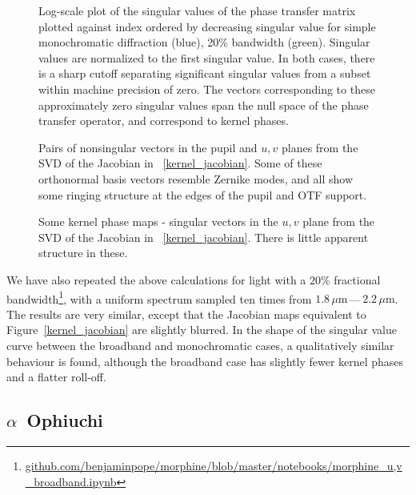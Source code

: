 \documentclass[modern]{aastex63}
\begin{document}
\begin{figure}
     \caption{Log-scale plot of the singular values of the phase transfer matrix plotted against index ordered by decreasing singular value for simple monochromatic diffraction (blue), 20\% bandwidth (green). Singular values are normalized to the first singular value. In both cases, there is a sharp cutoff separating significant singular values from a subset within machine precision of zero. The vectors corresponding to these approximately zero singular values span the null space of the phase transfer operator, and correspond to kernel phases.}
    \label{fig:svd}
\end{figure}

\begin{figure}
\caption{Pairs of nonsingular vectors in the pupil and $u,v$ planes from the SVD of the Jacobian in ~\ref{kernel_jacobian}. Some of these orthonormal basis vectors resemble Zernike modes, and all show some ringing structure at the edges of the pupil and OTF support.
\label{nonsingular_modes}}
\end{figure}

\begin{figure}
\caption{Some kernel phase maps - singular vectors in the $u,v$ plane from the SVD of the Jacobian in ~\ref{kernel_jacobian}. There is little apparent structure in these.
\label{kernel_modes}}
\end{figure}

We have also repeated the above calculations for light with a $20\%$ fractional bandwidth\footnote{\href{https://github.com/benjaminpope/morphine/blob/master/notebooks/morphine_u,v_broadband.ipynb}{github.com/benjaminpope/morphine/blob/master/notebooks/morphine\_u,v\_broadband.ipynb}}, with a uniform spectrum sampled ten times from $1.8\,\mu\text{m}$\,---\,$2.2\,\mu\text{m}$. The results are very similar, except that the Jacobian maps equivalent to Figure~\ref{kernel_jacobian} are slightly blurred. In the shape of the singular value curve between the broadband and monochromatic cases, a qualitatively similar behaviour is found, although the broadband case has slightly fewer kernel phases and a flatter roll-off.

\subsection{$\alpha$~Ophiuchi}
\label{sec:palomar}
\end{document}
